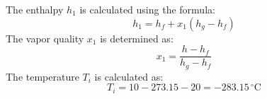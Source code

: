 The enthalpy \( h_1 \) is calculated using the formula:  
\[
h_1 = h_f + x_1 (h_g - h_f)
\]  
The vapor quality \( x_1 \) is determined as:  
\[
x_1 = \frac{h - h_f}{h_g - h_f}
\]  
The temperature \( T_i \) is calculated as:  
\[
T_i = 10 - 273.15 - 20 = -283.15 \, ^\circ\text{C}
\]